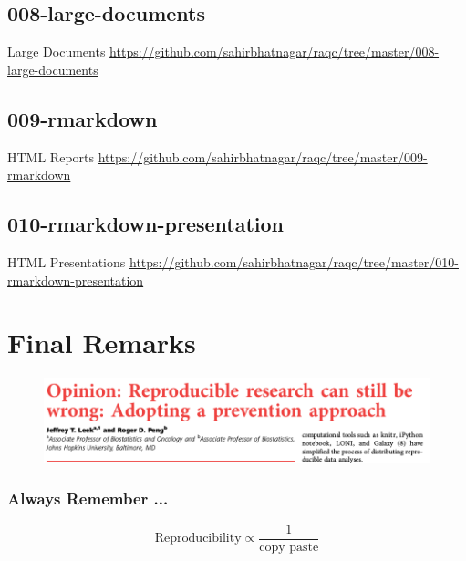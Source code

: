 \documentclass[10pt]{beamer}\usepackage[]{graphicx}\usepackage[]{color}
\begin{document}
\subsection{008-large-documents}

\begin{frame}{Large Documents}
\href{https://github.com/sahirbhatnagar/raqc/tree/master/008-large-documents}{https://github.com/sahirbhatnagar/raqc/tree/master/008-large-documents}
\end{frame}

\subsection{009-rmarkdown}

\begin{frame}{HTML Reports}
\href{https://github.com/sahirbhatnagar/raqc/tree/master/009-rmarkdown}{https://github.com/sahirbhatnagar/raqc/tree/master/009-rmarkdown}
\end{frame}

\subsection{010-rmarkdown-presentation}

\begin{frame}{HTML Presentations}
\href{https://github.com/sahirbhatnagar/raqc/tree/master/010-rmarkdown-presentation}{https://github.com/sahirbhatnagar/raqc/tree/master/010-rmarkdown-presentation}
\end{frame}



\section{Final Remarks}

\begin{frame}
\begin{figure}[h!]
\centering
\includegraphics[scale=0.30, keepaspectratio]{./leek}
\end{figure}
\end{frame}

\begin{frame}
\frametitle{Always Remember ...}

\[ \textrm{Reproducibility} \propto \frac{1}{\textrm{copy paste}}  \]


\end{frame}
\end{document}
